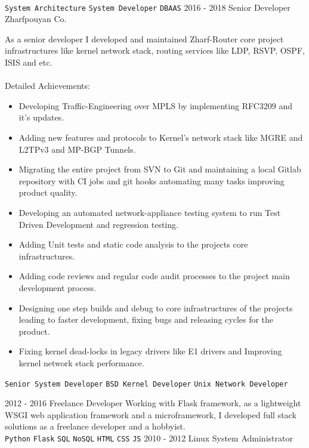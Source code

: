 \documentclass[12pt]{developercv}
\begin{document}
\begin{entrylist}
{		\\
		\texttt{System Architecture}\slashsep
		\texttt{System Developer}\slashsep
		\texttt{DBAAS}\slashsep
		}
	\entry
		{2016 - 2018}
		{Senior Developer}
		{Zharfpouyan Co.}
		{
		As a senior developer I developed and maintained Zharf-Router core project
		infrastructures like kernel network stack, routing services like LDP, RSVP,
		OSPF, ISIS and etc.
		\\
		\\
		Detailed Achievements:
		\begin{itemize}
			\item Developing Traffic-Engineering over MPLS by implementing RFC3209
				  and it's updates.
			\item Adding new features and protocols to Kernel's network stack like
				  MGRE and L2TPv3 and MP-BGP Tunnels.
			\item Migrating the entire project from SVN to Git and maintaining a
				  local Gitlab repository with CI jobs and git hooks automating
				  many tasks improving product quality.
			\item Developing an automated network-appliance testing system to run
				  Test Driven Development and regression testing.
			\item Adding Unit tests and static code analysis to the projects core
				  infrastructures.
			\item Adding code reviews and regular code audit processes to the project
				  main development process.
			\item Designing one step builds and debug to core infrastructures of the
				  projects leading to faster development, fixing bugs and releasing
				  cycles for the product. 
			\item Fixing kernel dead-locks in legacy drivers like E1 drivers and
			      Improving kernel network stack performance.
		\end{itemize}
		\texttt{Senior System Developer}\slashsep
		\texttt{BSD Kernel Developer}\slashsep
		\texttt{Unix Network Developer}
		}
	\entry
		{2012 - 2016}
		{Freelance Developer}
		{}
		{
		Working with Flask framework, as a lightweight WSGI web application
		framework and a microframework, I developed full stack solutions as a
		freelance developer and a hobbyist. 
		\\
		\texttt{Python}\slashsep
		\texttt{Flask}\slashsep
		\texttt{SQL}\slashsep
		\texttt{NoSQL}\slashsep
		\texttt{HTML}\slashsep
		\texttt{CSS}\slashsep
		\texttt{JS}
		}
	\entry
		{2010 - 2012}
		{Linux System Administrator}

\end{entrylist}
\end{document}
